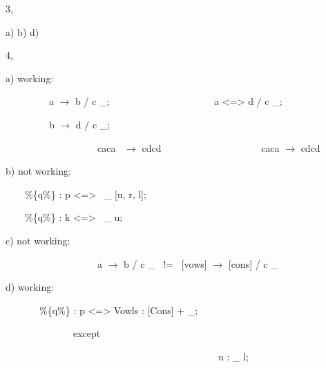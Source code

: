 \documentclass[letterpaper]{article}
\begin{document}
\bigskip

3,

a) b) d)


\bigskip

4,

a) working: 

\ \  \ \ \ \ \ \ \ a $\rightarrow $ b / c \_; \ \ \ \ \ \ \ \ \ \ \ \ \ \ \ \ \ \ \ \ \ a {\textless}={\textgreater} d /
c \_;

\ \  \ \ \ \ \ \ \ b $\rightarrow $ d / c \_; \ \ \ \ \ \ \ \ \ \ \ \ \ \ \ \ \ \ \ \ \ 


\bigskip

\ \ \ \ \ \ \ \ \ \ \ \ \ \ \ \ \ \ \ caca \ $\rightarrow $ cdcd \ \ \ \ \ \ \ \ \ \ \ \ \ \ \ \ \ \ \ \ caca
$\rightarrow $ cdcd


\bigskip

b) not working: 

\ \ \ \ \%\{q\%\} : p {\textless}={\textgreater} \ \_ [u, r, l];

\ \ \ \ \%\{q\%\} : k {\textless}={\textgreater} \ \_ u;


\bigskip

c) not working:

\ \ \ \ \ \ \ \ \ \ \ \ \ \ \ \ \ \ \ a $\rightarrow $ b / c \_ \ != \ [vows] $\rightarrow $ [cons] / c \_


\bigskip

d) working:

\ \  \ \ \ \ \ \%\{q\%\} : p {\textless}={\textgreater} Vowls : [Cons] + \_;

\ \ \ \ \ \ \ \ \ \ \ \ \ \ except

\ \ \ \ \ \ \ \ \ \ \ \ \ \ \ \ \ \ \ \ \ \ \ \ \ \ \ \ \ \ \ \ \ \ \ \ \ \ \ \ \ \ \ \ u : \_ l;


\bigskip


\bigskip
\end{document}
